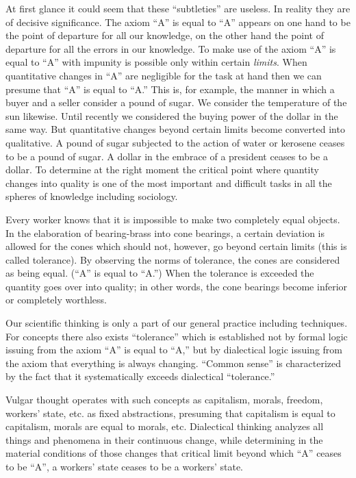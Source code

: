 At first glance it could seem that these “subtleties” are useless. In reality they are of decisive significance. The axiom “A” is equal to “A” appears on one hand to be the point of departure for all our knowledge, on the other hand the point of departure for all the errors in our knowledge. To make use of the axiom “A” is equal to “A” with impunity is possible only within certain \emph{limits}. When quantitative changes in “A” are negligible for the task at hand then we can presume that “A” is equal to “A.” This is, for example, the manner in which a buyer and a seller consider a pound of sugar. We consider the temperature of the sun likewise. Until recently we considered the buying power of the dollar in the same way. But quantitative changes beyond certain limits become converted into qualitative. A pound of sugar subjected to the action of water or kerosene ceases to be a pound of sugar. A dollar in the embrace of a president ceases to be a dollar. To determine at the right moment the critical point where quantity changes into quality is one of the most important and difficult tasks in all the spheres of knowledge including sociology.

Every worker knows that it is impossible to make two completely equal objects. In the elaboration of bearing-brass into cone bearings, a certain deviation is allowed for the cones which should not, however, go beyond certain limits (this is called tolerance). By observing the norms of tolerance, the cones are considered as being equal. (“A” is equal to “A.”) When the tolerance is exceeded the quantity goes over into quality; in other words, the cone bearings become inferior or completely worthless.

Our scientific thinking is only a part of our general practice including techniques. For concepts there also exists “tolerance” which is established not by formal logic issuing from the axiom “A” is equal to “A,” but by dialectical logic issuing from the axiom that everything is always changing. “Common sense” is characterized by the fact that it systematically exceeds dialectical “tolerance.”

Vulgar thought operates with such concepts as capitalism, morals, freedom, workers’ state, etc. as fixed abstractions, presuming that capitalism is equal to capitalism, morals are equal to morals, etc. Dialectical thinking analyzes all things and phenomena in their continuous change, while determining in the material conditions of those changes that critical limit beyond which “A” ceases to be “A”, a workers’ state ceases to be a workers’ state.

